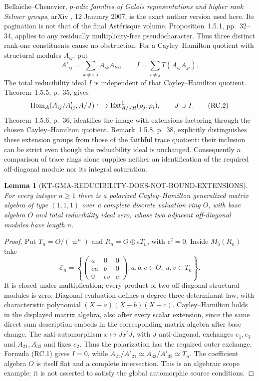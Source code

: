 \documentclass[11pt,a4paper]{article}
\newtheorem{lemma}[theorem]{Lemma}
\theoremstyle{definition}
\begin{document}
Bella\"iche--Chenevier, \emph{$p$-adic families of Galois
representations and higher rank Selmer groups}, arXiv
, 12 January 2007, is the exact author
version used here.  Its pagination is not that of the final
Ast\'erisque volume.  Proposition~1.5.1, pp.~32--34, applies
to any residually multiplicity-free pseudocharacter.  Thus
three distinct rank-one constituents cause no obstruction.
For a Cayley--Hamilton quotient with structural modules $A_{ij}$,
put
\[
 A'_{ij}=\sum_{k\ne i,j}A_{ik}A_{kj},\qquad
 I=\sum_{i\ne j}T(A_{ij}A_{ji}).                         \tag{RC.1}
\]
The total reducibility ideal $I$ is independent of that
Cayley--Hamilton quotient.  Theorem~1.5.5, p.~35, gives
\[
 \operatorname{Hom}_A(A_{ij}/A'_{ij},A/J)
       \lhook\joinrel\longrightarrow
       \operatorname{Ext}^1_{R/JR}(\rho_j,\rho_i),
       \qquad J\supset I.                                \tag{RC.2}
\]
Theorem~1.5.6, p.~36, identifies the image with extensions
factoring through the chosen Cayley--Hamilton quotient.
Remark~1.5.8, p.~38, explicitly distinguishes these extension
groups from those of the faithful trace quotient: their
inclusion can be strict even though the reducibility ideal
is unchanged.  Consequently a comparison of trace rings
alone supplies neither an identification of the required
off-diagonal module nor its integral saturation.

\begin{lemma}[KT-GMA-REDUCIBILITY-DOES-NOT-BOUND-EXTENSIONS]
For every integer $n\geq1$ there is a polarized
Cayley--Hamilton generalized matrix algebra of type $(1,1,1)$
over a complete discrete valuation ring $O$, with base
algebra $O$ and total reducibility ideal zero, whose two
adjacent off-diagonal modules have length $n$.
\end{lemma}
\begin{proof}
Put $T_n=O/(\varpi^n)$ and
$R_n=O\oplus\epsilon T_n$, with $\epsilon^2=0$.
Inside $M_3(R_n)$ take
\[
 \mathcal E_n=
 \left\{
 \begin{pmatrix}
 a&0&0\\ \epsilon u&b&0\\0&\epsilon v&c
 \end{pmatrix}:
 a,b,c\in O,\ u,v\in T_n\right\}.                       \tag{RC.3}
\]
It is closed under multiplication; every product of two
off-diagonal structural modules is zero.  Diagonal
evaluation defines a degree-three determinant law, with
characteristic polynomial $(X-a)(X-b)(X-c)$.
Cayley--Hamilton holds in the displayed matrix algebra,
also after every scalar extension, since the same direct
sum description embeds in the corresponding matrix
algebra after base change.  The anti-automorphism
$x\mapsto Jx^tJ$, with $J$ anti-diagonal, exchanges
$e_1,e_3$ and $A_{21},A_{32}$ and fixes $e_2$.
Thus the polarization has the required outer exchange.
Formula (RC.1) gives $I=0$, while
$A_{21}/A'_{21}\simeq A_{32}/A'_{32}\simeq T_n$.
The coefficient algebra $O$ is itself flat and a complete
intersection.  This is an algebraic scope example; it is
not asserted to satisfy the global automorphic source
conditions.
\end{proof}
\end{document}

